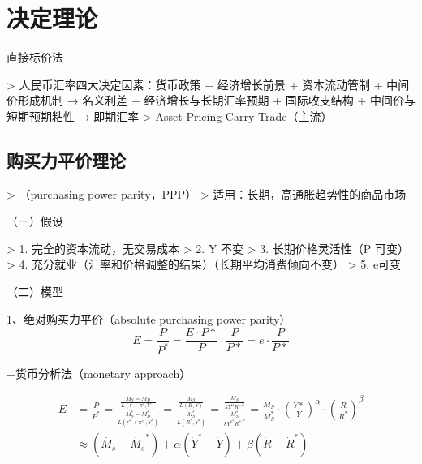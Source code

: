 \documentclass[12pt]{book}
\begin{document}
\section{决定理论}







直接标价法

> 人民币汇率四大决定因素：货币政策 + 经济增长前景 + 资本流动管制 + 中间价形成机制 → 名义利差 + 经济增长与长期汇率预期 + 国际收支结构 + 中间价与短期预期粘性 → 即期汇率   
> Asset Pricing-Carry Trade（主流）


\subsection{购买力平价理论}

> （purchasing power parity，PPP）  
> 适用：长期，高通胀趋势性的商品市场


（一）假设

	
> 1. 完全的资本流动，无交易成本  
> 2. Y 不变  
> 3. 长期价格灵活性（P 可变）  
> 4. 充分就业（汇率和价格调整的结果）（长期平均消费倾向不变）  
> 5. e可变  




（二）模型


1、绝对购买力平价（absolute purchasing power parity）
$$
E=\frac{P}{P^\ast}
=\frac{E·P*}{P}·\frac{P}{P*}=e⋅\frac{P}{P*}
$$

+货币分析法（monetary approach）

\begin{align*}
E
&=\frac{P}{P^\ast}
=\frac{\frac{M_S=M_D}{L\left(r+\pi^e,Y\right)}}{\frac{M_S^\ast=M_D^\ast}{L\left(r^\ast+\pi^{e^\ast},Y^\ast\right)}}
=\frac{\frac{M_S}{L\left(R,Y\right)}}{\frac{M_S^\ast}{L\left(R^\ast,Y^\ast\right)}}
=\frac{\frac{M_S}{kY^\alpha R^{-\beta}}}{\frac{M_S^\ast}{kY^{\ast^\alpha}R^{\ast^{-\beta}}}}
=\frac{M_S}{M_S^\ast}·(\frac{Y*}{Y})^\alpha·(\frac{R}{R^*})^\beta\\
&\approx (\dot{M_s}-\dot{M_s}^*)+\alpha(\dot{Y}^*-\dot{Y})+\beta(\dot{R}-\dot{R}^*)
\end{align*}
\end{document}
